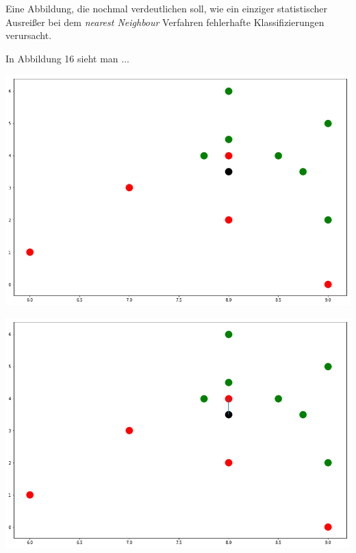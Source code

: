 \documentclass[fontsize=11pt]{scrartcl}
\newenvironment{Figure}
  {\par\medskip\noindent\minipage{\linewidth}}
  {\endminipage\par\medskip}
\begin{document}
                Eine Abbildung, die nochmal verdeutlichen soll, wie ein einziger statistischer Ausreißer bei dem \emph{nearest Neighbour} Verfahren fehlerhafte Klassifizierungen verursacht.\par 
                In Abbildung 16 sieht man ...
                \begin{Figure}
                    \begin{minipage}[b]{.4\linewidth}
                        \includegraphics[scale=0.2]{errnn1.png}
                    \end{minipage}
                    \hspace{.1\linewidth}
                    \begin{minipage}[b]{.4\linewidth}
                        \includegraphics[scale=0.2]{errnn2.png}

\end{minipage}
\end{Figure}
\end{document}
